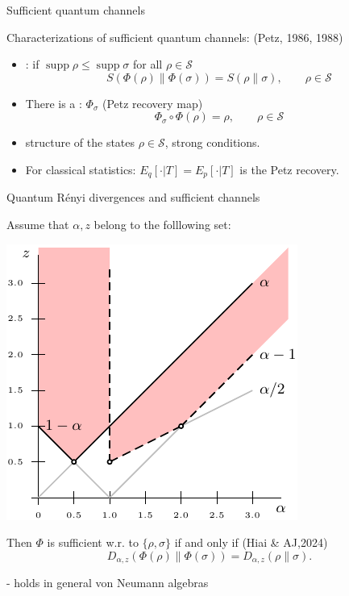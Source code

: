 \documentclass[mathserif]{beamer}
\newcommand{\<}{\langle}
\renewcommand{\>}{\rangle}
\newcommand{\supp}{\operatorname{supp}}
\newcommand{\Se}{\mathcal S}
\begin{document}
\begin{frame}{Sufficient quantum channels}

Characterizations of sufficient quantum channels: {\small (Petz, 1986, 1988)}

\bigskip
\begin{itemize}
\item {}: if $\supp \rho\le \supp \sigma$ for all $\rho\in \Se$
\[
S(\Phi(\rho)\|\Phi(\sigma))=S(\rho\|\sigma),\qquad \rho\in \Se
\]
\item There is a :  $\Phi_\sigma$ (Petz recovery map)
\[
\Phi_\sigma\circ \Phi(\rho)=\rho,\qquad \rho\in  \Se
\]
\item structure of the states $\rho\in \Se$, strong conditions.
\vskip 3mm

\item For classical statistics: $E_q[\cdot|T]=E_p[\cdot|T]$ is the Petz recovery.


\end{itemize}



\end{frame}

\begin{frame}{Quantum R\'enyi divergences and sufficient channels}

Assume that $\alpha,z$ belong to the folllowing set: 

\includegraphics[scale=0.9]{obr_anna.pdf}

%
%
%
Then $\Phi$ is sufficient w.r. to $\{\rho,\sigma\}$ if and only if  {\small (Hiai \&
AJ,2024)}
\[
D_{\alpha,z}(\Phi(\rho)\|\Phi(\sigma))=D_{\alpha,z}(\rho\|\sigma).
\]


- holds in general von Neumann algebras

\end{frame}
\end{document}
